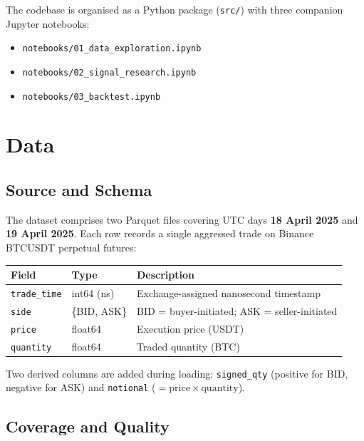 \documentclass[11pt, a4paper]{article}
\begin{document}
The codebase is organised as a Python package (\texttt{src/}) with three
companion Jupyter notebooks:

\begin{itemize}[leftmargin=2em, itemsep=0pt]
  \item \texttt{notebooks/01\_data\_exploration.ipynb}
  \item \texttt{notebooks/02\_signal\_research.ipynb}
  \item \texttt{notebooks/03\_backtest.ipynb}
\end{itemize}

\section{Data}

\subsection{Source and Schema}

The dataset comprises two Parquet files covering UTC days
\textbf{18 April 2025} and \textbf{19 April 2025}.
Each row records a single aggressed trade on Binance BTCUSDT perpetual futures:

\begin{center}
\begin{tabular}{lll}
\toprule
\textbf{Field} & \textbf{Type} & \textbf{Description} \\
\midrule
\texttt{trade\_time}  & int64 (ns)   & Exchange-assigned nanosecond timestamp \\
\texttt{side}         & \{BID, ASK\} & BID = buyer-initiated; ASK = seller-initiated \\
\texttt{price}        & float64      & Execution price (USDT) \\
\texttt{quantity}     & float64      & Traded quantity (BTC) \\
\bottomrule
\end{tabular}
\end{center}

Two derived columns are added during loading:
\texttt{signed\_qty} (positive for BID, negative for ASK) and
\texttt{notional} ($= \mathrm{price} \times \mathrm{quantity}$).

\subsection{Coverage and Quality}
\end{document}
